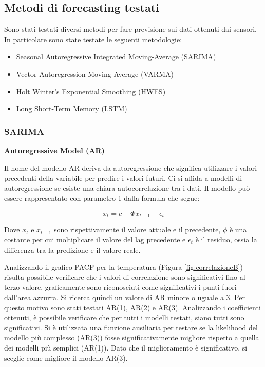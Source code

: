 \documentclass{article}
\begin{document}
\subsection{Metodi di forecasting testati}

Sono stati testati diversi metodi per fare previsione sui dati ottenuti dai sensori. In particolare sono state testate le seguenti metodologie:
\begin{itemize}
    \item Seasonal Autoregressive Integrated Moving-Average (SARIMA)
    \item Vector Autoregression Moving-Average (VARMA)
    \item Holt Winter’s Exponential Smoothing (HWES) 
    \item Long Short-Term Memory (LSTM)
\end{itemize}

\subsubsection{SARIMA}

\textbf{Autoregressive Model (AR)}
\medskip

Il nome del modello AR deriva da autoregressione che significa utilizzare i valori precedenti della variabile per predire i valori futuri. Ci si affida a modelli di autoregressione se esiste una chiara autocorrelazione tra i dati. Il modello può essere rappresentato con parametro 1 dalla formula che segue\cite{arima}:

$$x_t = c + \Phi x_{t-1} + \epsilon_t$$

Dove $x_t$ e $x_{t-1}$ sono rispettivamente il valore attuale e il precedente, $\phi$ è una costante per cui moltiplicare il valore del lag precedente e $\epsilon_t$  è il residuo, ossia la differenza tra la predizione e il valore reale.

Analizzando il grafico PACF per la temperatura (Figura \ref{fig:correlazioneB}) risulta possibile verificare che i valori di correlazione sono significativi fino al terzo valore, graficamente sono riconosciuti come significativi i punti fuori dall'area azzurra. Si ricerca quindi un valore di AR minore o uguale a 3. Per questo motivo sono stati testati AR(1), AR(2) e AR(3). Analizzando i coefficienti ottenuti, è possibile verificare che per tutti i modelli testati, siano tutti sono significativi. Si è utilizzata una funzione ausiliaria per testare se la likelihood del modello più complesso (AR(3)) fosse significativamente migliore rispetto a quella dei modelli più semplici  (AR(1)). Dato che il miglioramento è significativo, si sceglie come migliore il modello AR(3).
\end{document}
